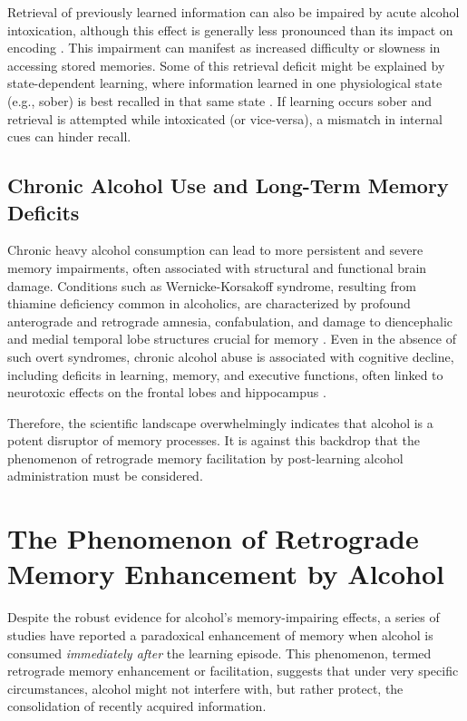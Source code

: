 \documentclass[12pt, a4paper]{article}
\begin{document}
Retrieval of previously learned information can also be impaired by acute alcohol intoxication, although this effect is generally less pronounced than its impact on encoding \cite{Parker1976}. This impairment can manifest as increased difficulty or slowness in accessing stored memories. Some of this retrieval deficit might be explained by state-dependent learning, where information learned in one physiological state (e.g., sober) is best recalled in that same state \cite{Goodwin1969}. If learning occurs sober and retrieval is attempted while intoxicated (or vice-versa), a mismatch in internal cues can hinder recall.

\subsection{Chronic Alcohol Use and Long-Term Memory Deficits}
Chronic heavy alcohol consumption can lead to more persistent and severe memory impairments, often associated with structural and functional brain damage. Conditions such as Wernicke-Korsakoff syndrome, resulting from thiamine deficiency common in alcoholics, are characterized by profound anterograde and retrograde amnesia, confabulation, and damage to diencephalic and medial temporal lobe structures crucial for memory \cite{OscarBerman2000}. Even in the absence of such overt syndromes, chronic alcohol abuse is associated with cognitive decline, including deficits in learning, memory, and executive functions, often linked to neurotoxic effects on the frontal lobes and hippocampus \cite{Fein2006}.

Therefore, the scientific landscape overwhelmingly indicates that alcohol is a potent disruptor of memory processes. It is against this backdrop that the phenomenon of retrograde memory facilitation by post-learning alcohol administration must be considered.

\section{The Phenomenon of Retrograde Memory Enhancement by Alcohol}
Despite the robust evidence for alcohol's memory-impairing effects, a series of studies have reported a paradoxical enhancement of memory when alcohol is consumed \textit{immediately after} the learning episode. This phenomenon, termed retrograde memory enhancement or facilitation, suggests that under very specific circumstances, alcohol might not interfere with, but rather protect, the consolidation of recently acquired information.
\end{document}
